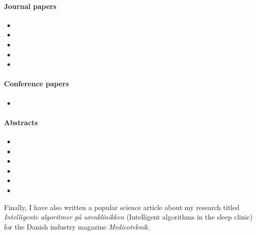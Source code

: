\begin{refsection}[ownpubs]
    \small
    \paragraph{Journal papers}
        \begin{itemize}[label=--]
            \item {}
            \item {}
            \item {}
            \item {}
            \item {}
        \end{itemize}
        
    \paragraph{Conference papers}
    \begin{itemize}[label=--]
        \item {}
    \end{itemize}
    
    \paragraph{Abstracts}
    \begin{itemize}[label=--]
        \item {}
        \item {}
        \item {}
        \item {}
        \item {}
        \item {}
    \end{itemize}
    
\end{refsection}


\noindent Finally, I have also written a popular science article about my research titled \emph{Intelligente algoritmer på søvnklinikken} (Intelligent algorithms in the sleep clinic) for the Danish industry magazine \emph{Medicoteknik}.